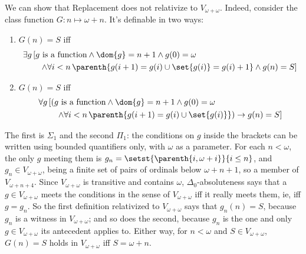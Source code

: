 \begin{boxnexample}
    We can show that Replacement does not relativize to $V_{\omega + \omega}$. Indeed, consider the class function $G : n \mapsto \omega + n$. It's definable in two ways:
    \begin{enumerate}
        \item $G(n) = S$ iff
        \begin{align*}
            &\exists g \left[ g \text{ is a function} \land \dom{g} = n + 1 \land g(0) = \omega \right. \\
            &\qquad \left. \land \forall i < n \, \parenth{g(i + 1) = g(i) \cup \set{g(i)} = g(i) + 1} \land g(n) = S \right]
        \end{align*}
        \item $G(n) = S$ iff
        \begin{align*}
            &\forall g \left[ \left( g \text{ is a function} \land \dom{g} = n + 1 \land g(0) = \omega \right. \right. \\
            &\qquad \left. \left. \land \forall i < n \, \parenth{g(i + 1) = g(i) \cup \set{g(i)}} \right) \to g(n) = S \right]
        \end{align*}
    \end{enumerate}
    The first is $\Sigma_1$ and the second $\Pi_1$: the conditions on $g$ inside the brackets can be written using bounded quantifiers only, with $\omega$ as a parameter. For each $n < \omega$, the only $g$ meeting them is $g_n = \setst{\parenth{i, \omega + i}}{i \leq n}$, and $g_n \in V_{\omega + \omega}$, being a finite set of pairs of ordinals below $\omega + n + 1$, so a member of $V_{\omega + n + 4}$. Since $V_{\omega + \omega}$ is transitive and contains $\omega$, $\Delta_0$-absoluteness says that a $g \in V_{\omega + \omega}$ meets the conditions in the sense of $V_{\omega + \omega}$ iff it really meets them, ie, iff $g = g_n$. So the first definition relativized to $V_{\omega + \omega}$ says that $g_n(n) = S$, because $g_n$ is a witness in $V_{\omega + \omega}$; and so does the second, because $g_n$ is the one and only $g \in V_{\omega + \omega}$ its antecedent applies to. Either way, for $n < \omega$ and $S \in V_{\omega + \omega}$, $G(n) = S$ holds in $V_{\omega + \omega}$ iff $S = \omega + n$.


\end{boxnexample}
